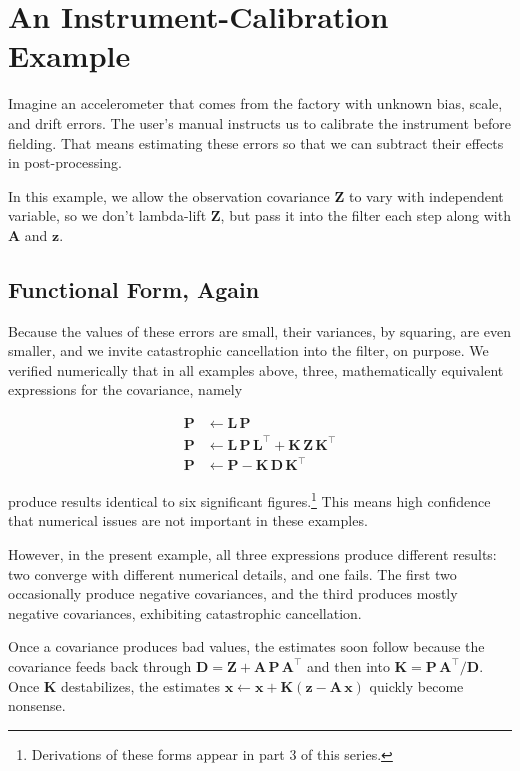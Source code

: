 \documentclass[10pt,oneside,x11names]{article}
\begin{document}
\section{An Instrument-Calibration Example}
\label{sec:orgheadline26}

Imagine an accelerometer that comes from the factory with unknown bias, scale,
and drift errors. The user's manual instructs us to calibrate the instrument
before fielding. That means estimating these errors so that we can subtract
their effects in post-processing. 

In this example, we allow the observation covariance \(\mathbold{Z}\) to vary with
independent variable, so we don't lambda-lift \(\mathbold{Z}\), but pass it into
the filter each step along with \(\mathbold{A}\) and \(\mathbold{z}\).

\subsection{Functional Form, Again}
\label{sec:orgheadline22}

Because the values of these errors are small, their variances, by squaring, are
even smaller, and we invite catastrophic cancellation into the filter, on
purpose. We verified numerically that in all examples above, three,
mathematically equivalent expressions for the covariance, namely

\begin{align*}
\mathbold{P} &\leftarrow
\mathbold{L}\,
\mathbold{P} 
\\
\mathbold{P} &\leftarrow
\mathbold{L}\,
\mathbold{P}\,
\mathbold{L}^\intercal +
\mathbold{K}\,
\mathbold{Z}\,
\mathbold{K}^\intercal
\\
\mathbold{P} &\leftarrow
\mathbold{P} -
\mathbold{K}\,
\mathbold{D}\,
\mathbold{K}^\intercal
\end{align*}

\noindent produce results identical to six significant 
figures.\footnote{Derivations of these forms appear in part 3 of this series.} 
This means high
confidence that numerical issues are not important in these examples.

However, in the present example, all three expressions produce different
results: two converge with different numerical details, and one fails. The first
two occasionally produce negative covariances, and the third produces mostly
negative covariances, exhibiting catastrophic cancellation.

Once a covariance produces bad values, the estimates soon follow because the
covariance feeds back through
\(\mathbold{D}=\mathbold{Z}+\mathbold{A}\,\mathbold{P}\,\mathbold{A}^\intercal\)
and then into \(\mathbold{K}=\mathbold{P}\,\mathbold{A}^\intercal/\mathbold{D}\).
Once \(\mathbold{K}\) destabilizes, the estimates
\(\mathbold{x}\leftarrow\mathbold{x}+\mathbold{K}(\mathbold{z}-\mathbold{A}\,\mathbold{x})\)
quickly become nonsense.
\end{document}
